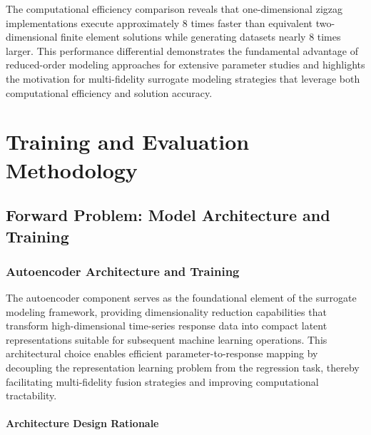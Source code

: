 \documentclass[12pt,a4paper]{report}
\begin{document}
The computational efficiency comparison reveals that one-dimensional zigzag implementations execute approximately $8$ times faster than equivalent two-dimensional finite element solutions while generating datasets nearly $8$ times larger. This performance differential demonstrates the fundamental advantage of reduced-order modeling approaches for extensive parameter studies and highlights the motivation for multi-fidelity surrogate modeling strategies that leverage both computational efficiency and solution accuracy.




\chapter{Training and Evaluation Methodology}
\label{chap:methodology}



\section{Forward Problem: Model Architecture and Training}
\label{sec:forward_problem}

\subsection{Autoencoder Architecture and Training}

The autoencoder component serves as the foundational element of the surrogate modeling framework, providing dimensionality reduction capabilities that transform high-dimensional time-series response data into compact latent representations suitable for subsequent machine learning operations. This architectural choice enables efficient parameter-to-response mapping by decoupling the representation learning problem from the regression task, thereby facilitating multi-fidelity fusion strategies and improving computational tractability.

\subsubsection{Architecture Design Rationale}
\end{document}
